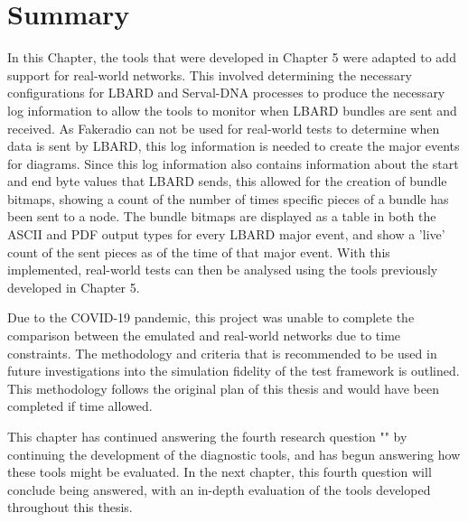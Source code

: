 \section{Summary}
In this Chapter, the tools that were developed in Chapter 5 were adapted to add support for real-world networks.
This involved determining the necessary configurations for LBARD and Serval-DNA processes to produce the necessary log information to allow the tools to monitor when LBARD bundles are sent and received.
As Fakeradio can not be used for real-world tests to determine when data is sent by LBARD, this log information is needed to create the major events for diagrams.
Since this log information also contains information about the start and end byte values that LBARD sends, this allowed for the creation of bundle bitmaps, showing a count of the number of times specific pieces of a bundle has been sent to a node.
The bundle bitmaps are displayed as a table in both the ASCII and PDF output types for every LBARD major event, and show a 'live' count of the sent pieces as of the time of that major event.
With this implemented, real-world tests can then be analysed using the tools previously developed in Chapter 5.

Due to the COVID-19 pandemic, this project was unable to complete the comparison between the emulated and real-world networks due to time constraints. 
The methodology and criteria that is recommended to be used in future investigations into the simulation fidelity of the test framework is outlined. 
This methodology follows the original plan of this thesis and would have been completed if time allowed.

This chapter has continued answering the fourth research question "\fourthRQ" by continuing the development of the diagnostic tools, and has begun answering how these tools might be evaluated.
In the next chapter, this fourth question will conclude being answered, with an in-depth evaluation of the tools developed throughout this thesis.
